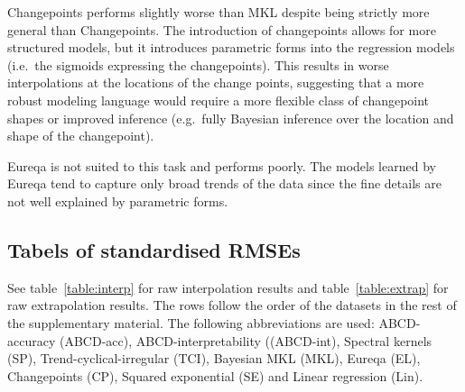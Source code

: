 \documentclass[letterpaper]{article}
\def\ie{i.e.\ }
\def\eg{e.g.\ }
\newcommand{\procedurename}{ABCD}
\begin{document}
Changepoints performs slightly worse than MKL despite being strictly more general than Changepoints.
The introduction of changepoints allows for more structured models, but it introduces parametric forms into the regression models (\ie the sigmoids expressing the changepoints).
This results in worse interpolations at the locations of the change points, suggesting that a more robust modeling language would require a more flexible class of changepoint shapes or improved inference (\eg fully Bayesian inference over the location and shape of the changepoint).

Eureqa is not suited to this task and performs poorly.
The models learned by Eureqa tend to capture only broad trends of the data since the fine details are not well explained by parametric forms.

\subsection{Tabels of standardised RMSEs}

See table~\ref{table:interp} for raw interpolation results and table~\ref{table:extrap} for raw extrapolation results. 
The rows follow the order of the datasets in the rest of the supplementary material.
The following abbreviations are used: \procedurename{}-accuracy (\procedurename{}-acc), \procedurename{}-interpretability ((\procedurename{}-int), Spectral kernels (SP), Trend-cyclical-irregular (TCI), Bayesian MKL (MKL), Eureqa (EL), Changepoints (CP), Squared exponential (SE) and Linear regression (Lin).
\end{document}
